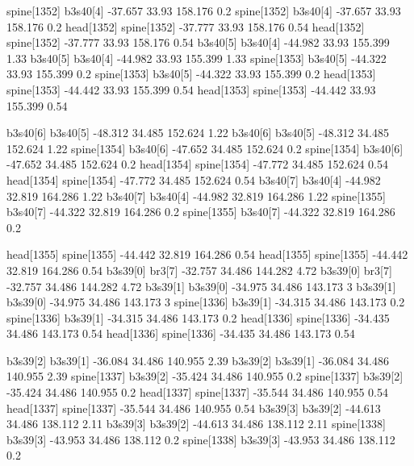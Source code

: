 spine[1352]    b3s40[4]    -37.657    33.93    158.176    0.2
spine[1352]    b3s40[4]    -37.657    33.93    158.176    0.2
head[1352]    spine[1352]    -37.777    33.93    158.176    0.54
head[1352]    spine[1352]    -37.777    33.93    158.176    0.54
b3s40[5]    b3s40[4]    -44.982    33.93    155.399    1.33
b3s40[5]    b3s40[4]    -44.982    33.93    155.399    1.33
spine[1353]    b3s40[5]    -44.322    33.93    155.399    0.2
spine[1353]    b3s40[5]    -44.322    33.93    155.399    0.2
head[1353]    spine[1353]    -44.442    33.93    155.399    0.54
head[1353]    spine[1353]    -44.442    33.93    155.399    0.54


b3s40[6]    b3s40[5]    -48.312    34.485    152.624    1.22
b3s40[6]    b3s40[5]    -48.312    34.485    152.624    1.22
spine[1354]    b3s40[6]    -47.652    34.485    152.624    0.2
spine[1354]    b3s40[6]    -47.652    34.485    152.624    0.2
head[1354]    spine[1354]    -47.772    34.485    152.624    0.54
head[1354]    spine[1354]    -47.772    34.485    152.624    0.54
b3s40[7]    b3s40[4]    -44.982    32.819    164.286    1.22
b3s40[7]    b3s40[4]    -44.982    32.819    164.286    1.22
spine[1355]    b3s40[7]    -44.322    32.819    164.286    0.2
spine[1355]    b3s40[7]    -44.322    32.819    164.286    0.2


head[1355]    spine[1355]    -44.442    32.819    164.286    0.54
head[1355]    spine[1355]    -44.442    32.819    164.286    0.54
b3s39[0]    br3[7]    -32.757    34.486    144.282    4.72
b3s39[0]    br3[7]    -32.757    34.486    144.282    4.72
b3s39[1]    b3s39[0]    -34.975    34.486    143.173    3
b3s39[1]    b3s39[0]    -34.975    34.486    143.173    3
spine[1336]    b3s39[1]    -34.315    34.486    143.173    0.2
spine[1336]    b3s39[1]    -34.315    34.486    143.173    0.2
head[1336]    spine[1336]    -34.435    34.486    143.173    0.54
head[1336]    spine[1336]    -34.435    34.486    143.173    0.54


b3s39[2]    b3s39[1]    -36.084    34.486    140.955    2.39
b3s39[2]    b3s39[1]    -36.084    34.486    140.955    2.39
spine[1337]    b3s39[2]    -35.424    34.486    140.955    0.2
spine[1337]    b3s39[2]    -35.424    34.486    140.955    0.2
head[1337]    spine[1337]    -35.544    34.486    140.955    0.54
head[1337]    spine[1337]    -35.544    34.486    140.955    0.54
b3s39[3]    b3s39[2]    -44.613    34.486    138.112    2.11
b3s39[3]    b3s39[2]    -44.613    34.486    138.112    2.11
spine[1338]    b3s39[3]    -43.953    34.486    138.112    0.2
spine[1338]    b3s39[3]    -43.953    34.486    138.112    0.2


